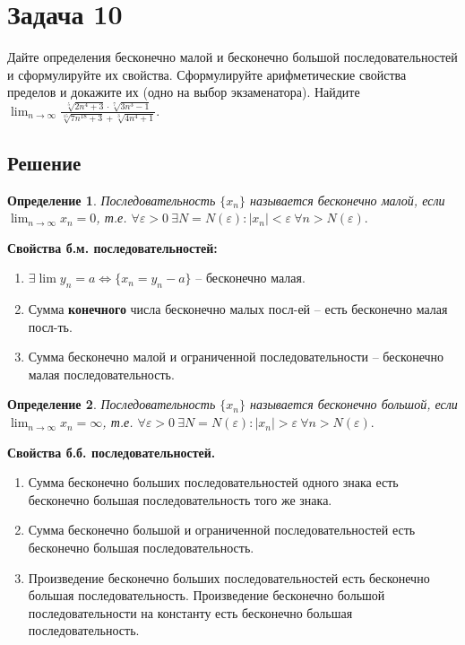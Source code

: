 \documentclass[a4paper,12pt]{article}
\newtheorem*{defi}{Определение}
\newcommand{\eps}{\varepsilon}
\begin{document}
    \section*{Задача 10}
    
    Дайте определения бесконечно малой и бесконечно большой последовательностей и сформулируйте их свойства. Сформулируйте арифметические свойства пределов и докажите их (одно на
выбор экзаменатора). Найдите $\displaystyle \lim_{n\rightarrow \infty} 
            \frac{
                   \sqrt[5]{2n^4 + 3} \cdot 
                   \sqrt[7]{3n^3 - 1}
                 }
                 {
                   \sqrt[15]{7n^{18} + 3} + 
                   \sqrt[3]{4n^4 + 1}
                 }.$
    
    \subsection*{Решение}
    
    \begin{defi} Последовательность $ \{ x_ n \} $ называется бесконечно малой, 
        если $\displaystyle \lim_{n \rightarrow \infty} x_n = 0$, т.е. 
        $\forall \eps > 0\ \exists N = N(\eps):|x_n| < \eps\ \forall n > N(\eps).$
    \end{defi}

    \textbf{Свойства б.м. последовательностей:}
        \begin{enumerate}
            \item $\exists \lim y_n = a \Leftrightarrow \{x_n = y_n - a\}$ -- бесконечно малая.
            \item Сумма \textbf{конечного} числа бесконечно малых посл-ей -- есть бесконечно малая посл-ть.
            \item Сумма бесконечно малой и ограниченной последовательности -- бесконечно малая последовательность.
        \end{enumerate}
    
    \begin{defi} Последовательность $ \{ x_ n \} $ называется бесконечно большой, 
        если $\displaystyle \lim_{n \rightarrow \infty} x_n = \infty$, т.е. 
        $\forall \eps > 0\ \exists N = N(\eps):|x_n| > \eps\ \forall n > N(\eps).$
    \end{defi}
    \textbf{Свойства б.б. последовательностей.}
        \begin{enumerate}
            \item Сумма бесконечно больших последовательностей одного знака есть бесконечно большая последовательность того же знака.
            \item Сумма бесконечно большой и ограниченной последовательностей есть бесконечно большая последовательность.
            \item Произведение бесконечно больших последовательностей есть бесконечно большая последовательность. Произведение бесконечно большой последовательности на константу есть бесконечно большая последовательность.
        \end{enumerate}
\end{document}

